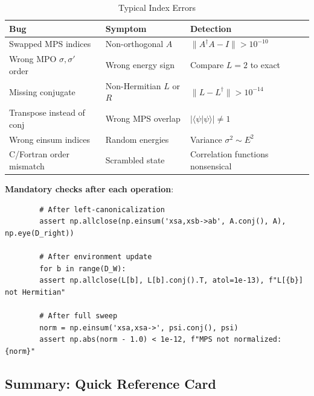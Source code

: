 \documentclass[aps,prb,onecolumn,scriptaddress]{revtex4-2}
\newcommand{\braket}[2]{\langle#1|#2\rangle}
\begin{document}
		\begin{table}[h]
		\centering
		\caption{Typical Index Errors}
		\begin{tabular}{@{}lll@{}}
			\toprule
			\textbf{Bug} & \textbf{Symptom} & \textbf{Detection} \\
			\midrule
			Swapped MPS indices & Non-orthogonal $A$ & $\|A^\dagger A - I\| > 10^{-10}$ \\
			Wrong MPO $\sigma, \sigma'$ order & Wrong energy sign & Compare $L=2$ to exact \\
			Missing conjugate & Non-Hermitian $L$ or $R$ & $\|L - L^\dagger\| > 10^{-14}$ \\
			Transpose instead of conj & Wrong MPS overlap & $|\braket{\psi}{\psi}| \neq 1$ \\
			Wrong einsum indices & Random energies & Variance $\sigma^2 \sim E^2$ \\
			C/Fortran order mismatch & Scrambled state & Correlation functions nonsensical \\
			\bottomrule
		\end{tabular}
		\end{table}
		
		\textbf{Mandatory checks after each operation}:
		\begin{verbatim}
		# After left-canonicalization
		assert np.allclose(np.einsum('xsa,xsb->ab', A.conj(), A), np.eye(D_right))
		
		# After environment update
		for b in range(D_W):
		assert np.allclose(L[b], L[b].conj().T, atol=1e-13), f"L[{b}] not Hermitian"
		
		# After full sweep
		norm = np.einsum('xsa,xsa->', psi.conj(), psi)
		assert np.abs(norm - 1.0) < 1e-12, f"MPS not normalized: {norm}"
		\end{verbatim}
		
		\subsection{Summary: Quick Reference Card}
		
\end{document}
